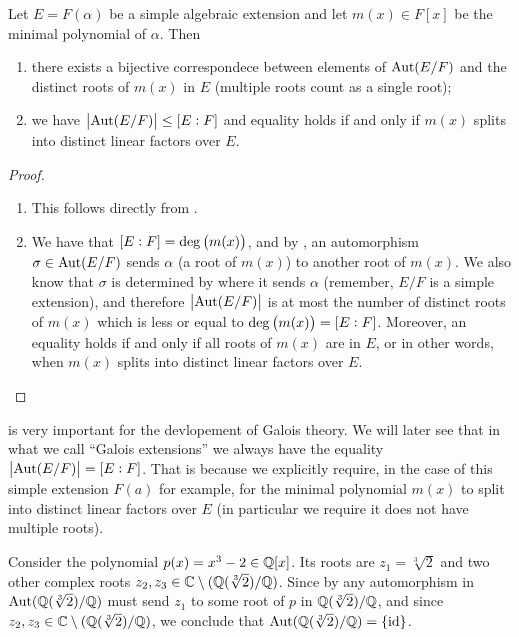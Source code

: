 \documentclass[11pt,a4paper]{article}
\begin{document}
\begin{corollary}
  \label{cor:size-of-Aut}
  Let $E = F(\alpha)$ be a simple algebraic extension
  and let $m(x) \in F[x]$ be the minimal polynomial of $\alpha$.
  Then
  \begin{enumerate}
    \item[(1)] there exists a bijective correspondece between elements
      of $\operatorname{Aut}(E/F)$ and the distinct roots of $m(x)$ in $E$
      (multiple roots count as a single root);
    \item[(2)] we have $\left|\operatorname{Aut}(E/F)\right| \le [E : F]$ and equality holds
      if and only if $m(x)$ splits into distinct linear factors over $E$.
  \end{enumerate}
\end{corollary}
\begin{proof} \phantom{}
\begin{enumerate}
  \item[(1)] This follows directly from .
  \item[(2)] We have that $[E : F] = \deg\del{m(x)}$,
    and by ,
    an automorphism $\sigma \in \operatorname{Aut}(E/F)$
    sends $\alpha$ (a root of $m(x)$) to another root of $m(x)$.
    We also know that $\sigma$ is determined by where it sends $\alpha$
    (remember, $E/F$ is a simple extension),
    and therefore $\left\lvert\operatorname{Aut}(E/F)\right\rvert$ is at most the number of distinct
    roots of $m(x)$ which is less or equal to $\deg\del{m(x)} = [E : F]$.
    Moreover, an equality holds if and only if all roots of $m(x)$ are in $E$,
    or in other words, when $m(x)$ splits into distinct linear
    factors over $E$.
\end{enumerate}
\end{proof}

\begin{remark}
  is very important for the devlopement of Galois theory.
  We will later see that in what we call ``Galois extensions''
  we always have the equality $\left|\operatorname{Aut}(E/F)\right| = [E : F]$.
  That is because we explicitly require, in the case of this
  simple extension $F(a)$ for example,
  for the minimal polynomial $m(x)$
  to split into distinct linear factors over $E$
  (in particular we require it does not have multiple roots).
\end{remark}

\begin{example}
  \label{exmp:aut-of-q}
  Consider the polynomial $p(x) = x^3 - 2 \in \mathbb{Q}[x]$.
  Its roots are $z_1 = \sqrt[3]{2}$
  and two other complex roots $z_2,z_3 \in \mathbb{C}\setminus(\mathbb{Q}(\sqrt[3]{2})/\mathbb{Q})$.
  Since by 
  any automorphism in $\operatorname{Aut}(\mathbb{Q}(\sqrt[3]{2})/\mathbb{Q})$
  must send $z_1$ to some root of $p$ in $\mathbb{Q}(\sqrt[3]{2})/\mathbb{Q}$,
  and since $z_2,z_3 \in \mathbb{C}\setminus(\mathbb{Q}(\sqrt[3]{2})/\mathbb{Q})$,
  we conclude that $\operatorname{Aut}(\mathbb{Q}(\sqrt[3]{2})/\mathbb{Q}) = \left\{\operatorname{id}\right\}$.
\end{example}
\end{document}
